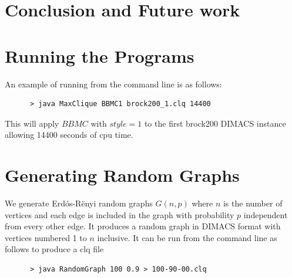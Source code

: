 \documentclass{l4proj}
\theoremstyle{definition}
\begin{document}
\chapter{Conclusion and Future work}

\begin{appendices}

\chapter{Running the Programs}
An example of running from the command line is as follows:
\begin{verbatim}
      > java MaxClique BBMC1 brock200_1.clq 14400
\end{verbatim}
This will apply $BBMC$ with $style = 1$ to the first brock200 DIMACS instance allowing 14400 seconds of cpu time.

\chapter{Generating Random Graphs}
\label{sec:randomGraph}
We generate Erd\'{o}s-R\"{e}nyi random graphs $G(n,p)$ where $n$ is the number of vertices and
each edge is included in the graph with probability $p$ independent from every other edge. It produces
a random graph in DIMACS format with vertices numbered 1 to $n$ inclusive. It can be run from the command line as follows to produce 
a clq file
\begin{verbatim}
      > java RandomGraph 100 0.9 > 100-90-00.clq
\end{verbatim}
\end{appendices}




\end{document}
